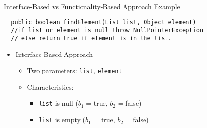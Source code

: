 \documentclass{beamer}
\begin{document}
\begin{frame}[fragile]{Interface-Based vs Functionality-Based Approach Example}
\begin{verbatim}
  public boolean findElement(List list, Object element)
  //if list or element is null throw NullPointerException
  // else return true if element is in the list.
\end{verbatim}
\begin{itemize}
 \item Interface-Based Approach
   \begin{itemize}
    \item Two parameters: {\tt list}, {\tt element}
    \item Characteristics:
      \begin{itemize}
       \item {\tt list} is null ($b_1$ = true, $b_2$ = false)
       \item {\tt list} is empty ($b_1$ = true, $b_2$ = false)
       \end{itemize}
    \end{itemize}
\end{itemize}
\end{frame}
%
\end{document}
